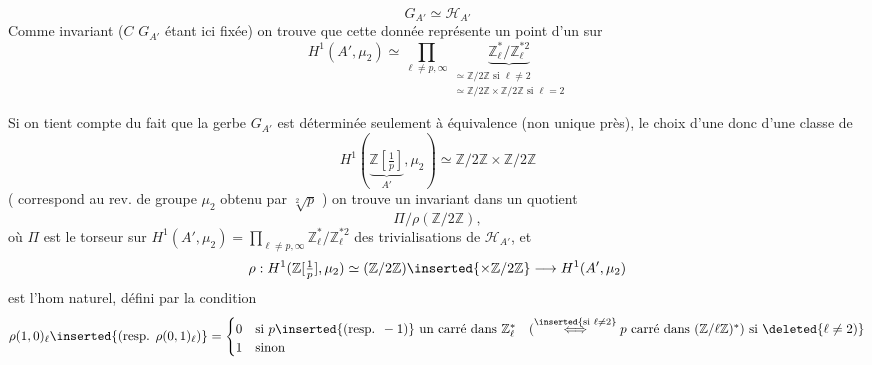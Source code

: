 
\[
G_{A'}\simeq\mathcal H_{A'}
\]
Comme invariant ($C$  $G_{A'}$  étant ici fixée) on trouve que cette donnée  représente un point d'un  sur
\[
H^1(A',\mu_2)\simeq\prod_{\ell\ne p,\infty}\underbrace{\mathbb Z_\ell^*/\mathbb Z_\ell^{*2}}_{\begin{gathered}\simeq\mathbb Z/2\mathbb Z\text{ si }\ell\ne2\\\simeq\mathbb Z/2\mathbb Z\times\mathbb Z/2\mathbb Z\text{ si }\ell=2\end{gathered}}
\]

Si on tient compte du fait que la gerbe $G_{A'}$ est déterminée seulement à équivalence (non unique près), le choix d'une   donc d'une classe de
\[
H^1(\underbrace{\mathbb Z[\tfrac1p]}_{A'},\mu_2)\simeq\mathbb Z/2\mathbb Z\times\mathbb Z/2\mathbb Z
\]
(   correspond au rev. de groupe $\mu_2$ obtenu par $\sqrt[2]{p}$ ) on trouve un invariant  dans un quotient
\[
\Pi/\rho(\mathbb Z/2\mathbb Z),
\]
où $\Pi$ est le torseur sur $H^1(A',\mu_2)=\prod_{\ell\ne p,\infty}\mathbb Z_\ell^*/\mathbb Z_\ell^{*2}$ des trivialisations de $\mathcal H_{A'}$, et
\[
\rho:H^1(\mathbb Z[\tfrac1p],\mu_2)\simeq(\mathbb Z/2\mathbb Z)\inserted{\times\mathbb Z/2\mathbb Z}\longrightarrow H^1(A',\mu_2)
\]
est l'hom naturel, défini par la condition
\[
\rho(1,0)_\ell\inserted{\text{(resp. }\rho(0,1)_\ell\text{)}}=
\begin{cases}
0&\text{si }p\inserted{\text{(resp. }-1\text{)}}\text{ un carré dans }\mathbb Z_\ell^*\quad(\overset{\inserted{\text{si }\ell\ne2}}{\Longleftrightarrow}p\text{ carré dans }(\mathbb Z/\ell\mathbb Z)^*\text{) si }\deleted{\ell\ne2)}\\
1&\text{sinon}
\end{cases}
\]

